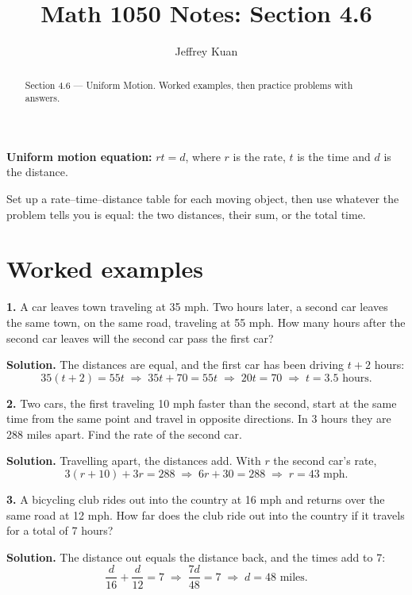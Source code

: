 \documentclass{ximera}
\author{Jeffrey Kuan}
\title{Math 1050 Notes: Section 4.6}
\begin{document}
\begin{abstract}
    Section 4.6 --- Uniform Motion.
    Worked examples, then practice problems with answers.
\end{abstract}

\maketitle

\textbf{Uniform motion equation:} $rt=d$, where $r$ is the rate, $t$ is the time and $d$
is the distance.

Set up a rate--time--distance table for each moving object, then use whatever the problem
tells you is equal: the two distances, their sum, or the total time.

\section*{Worked examples}

\begin{problem}
\textbf{1.} A car leaves town traveling at 35 mph. Two hours later, a second car leaves
the same town, on the same road, traveling at 55 mph. How many hours after the second car
leaves will the second car pass the first car?

\begin{hint}
\textbf{Solution.} The distances are equal, and the first car has been driving $t+2$
hours:
\[
  35(t+2)=55t \;\Longrightarrow\; 35t+70=55t \;\Longrightarrow\; 20t=70
  \;\Longrightarrow\; t=3.5 \text{ hours}.
\]
\end{hint}
\end{problem}

\begin{problem}
\textbf{2.} Two cars, the first traveling 10 mph faster than the second, start at the same
time from the same point and travel in opposite directions. In 3 hours they are 288 miles
apart. Find the rate of the second car.

\begin{hint}
\textbf{Solution.} Travelling apart, the distances add. With $r$ the second car's rate,
\[
  3(r+10)+3r=288 \;\Longrightarrow\; 6r+30=288 \;\Longrightarrow\; r=43 \text{ mph}.
\]
\end{hint}
\end{problem}

\begin{problem}
\textbf{3.} A bicycling club rides out into the country at 16 mph and returns over the
same road at 12 mph. How far does the club ride out into the country if it travels for a
total of 7 hours?

\begin{hint}
\textbf{Solution.} The distance out equals the distance back, and the times add to 7:
\[
  \frac{d}{16}+\frac{d}{12}=7 \;\Longrightarrow\; \frac{7d}{48}=7
  \;\Longrightarrow\; d=48 \text{ miles}.
\]
\end{hint}
\end{problem}
\end{document}
